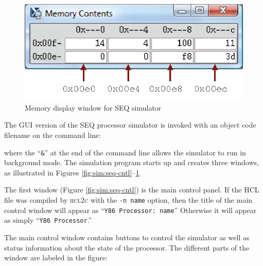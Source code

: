 \documentclass[11pt]{article}
\begin{document}
\begin{figure}
\centerline{\includegraphics*[scale=1.0]{pipe-mem.eps}}
\caption{Memory display window for SEQ simulator}
\label{fig:sim:seq-mem}
\end{figure}

The GUI version of the SEQ processor simulator is invoked with 
an object code filename on the command line:
\begin{tty}
\end{tty}
where the ``\texttt{\&}'' at the end of the command line allows the
simulator to run in background mode.  The simulation program starts up
and creates three windows, as illustrated in Figures
\ref{fig:sim:seq-cntl}--\ref{fig:sim:seq-mem}.

The first window (Figure \ref{fig:sim:seq-cntl}) is the main control
panel. If the HCL file was compiled by \textsc{hcl2c} with the
\texttt{-n name} option, then the title of the main control window will appear
as ``\texttt{Y86 Processor: name}''
Otherwise it will appear as simply
``\texttt{Y86 Processor}.''

The main control window contains buttons to control the simulator as
well as status information about the state of the processor.  The
different parts of the window are labeled in the figure:
\end{document}
